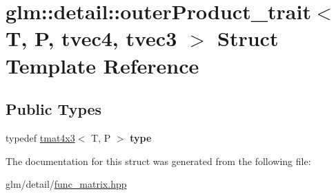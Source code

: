 \hypertarget{structglm_1_1detail_1_1outerProduct__trait_3_01T_00_01P_00_01tvec4_00_01tvec3_01_4}{\section{glm\-:\-:detail\-:\-:outer\-Product\-\_\-trait$<$ T, P, tvec4, tvec3 $>$ Struct Template Reference}
\label{structglm_1_1detail_1_1outerProduct__trait_3_01T_00_01P_00_01tvec4_00_01tvec3_01_4}
}
\subsection*{Public Types}
\begin{DoxyCompactItemize}
\item 
\hypertarget{structglm_1_1detail_1_1outerProduct__trait_3_01T_00_01P_00_01tvec4_00_01tvec3_01_4_ac754af38f5684e757b9fcc70ecaea5c8}{typedef \hyperlink{structglm_1_1tmat4x3}{tmat4x3}$<$ T, P $>$ {\bfseries type}}\label{structglm_1_1detail_1_1outerProduct__trait_3_01T_00_01P_00_01tvec4_00_01tvec3_01_4_ac754af38f5684e757b9fcc70ecaea5c8}

\end{DoxyCompactItemize}


The documentation for this struct was generated from the following file\-:\begin{DoxyCompactItemize}
\item 
glm/detail/\hyperlink{func__matrix_8hpp}{func\-\_\-matrix.\-hpp}\end{DoxyCompactItemize}
